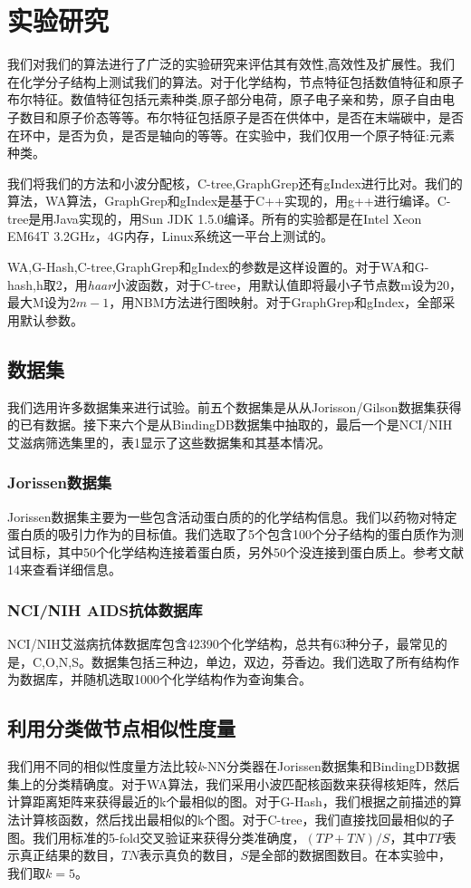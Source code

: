 \documentclass{article}
\begin{document}
\else

\fi
\section{实验研究}
我们对我们的算法进行了广泛的实验研究来评估其有效性,高效性及扩展性。我们在化学分子结构上测试我们的算法。对于化学结构，节点特征包括数值特征和原子布尔特征。数值特征包括元素种类,原子部分电荷，原子电子亲和势，原子自由电子数目和原子价态等等。布尔特征包括原子是否在供体中，是否在末端碳中，是否在环中，是否为负，是否是轴向的等等。在实验中，我们仅用一个原子特征:元素种类。

我们将我们的方法和小波分配核，C-tree,GraphGrep还有gIndex进行比对。我们的算法，WA算法，GraphGrep和gIndex是基于C++实现的，用g++进行编译。C-tree是用Java实现的，用Sun JDK 1.5.0编译。所有的实验都是在Intel Xeon EM64T 3.2GHz，4G内存，Linux系统这一平台上测试的。

WA,G-Hash,C-tree,GraphGrep和gIndex的参数是这样设置的。对于WA和G-hash,h取2，用\emph{haar}小波函数，对于C-tree，用默认值即将最小子节点数m设为20，最大M设为$2m-1$，用NBM方法进行图映射。对于GraphGrep和gIndex，全部采用默认参数。

\subsection{数据集}
我们选用许多数据集来进行试验。前五个数据集是从从Jorisson/Gilson数据集获得的已有数据。接下来六个是从BindingDB数据集中抽取的，最后一个是NCI/NIH 艾滋病筛选集里的，表1显示了这些数据集和其基本情况。
\subsubsection{Jorissen数据集}
Jorissen数据集主要为一些包含活动蛋白质的的化学结构信息。我们以药物对特定蛋白质的吸引力作为的目标值。我们选取了5个包含100个分子结构的蛋白质作为测试目标，其中50个化学结构连接着蛋白质，另外50个没连接到蛋白质上。参考文献14来查看详细信息。

\subsubsection{NCI/NIH AIDS抗体数据库}
NCI/NIH艾滋病抗体数据库包含42390个化学结构，总共有63种分子，最常见的是，C,O,N,S。数据集包括三种边，单边，双边，芬香边。我们选取了所有结构作为数据库，并随机选取1000个化学结构作为查询集合。
\subsection{利用分类做节点相似性度量}
我们用不同的相似性度量方法比较\emph{k}-NN分类器在Jorissen数据集和BindingDB数据集上的分类精确度。对于WA算法，我们采用小波匹配核函数来获得核矩阵，然后计算距离矩阵来获得最近的k个最相似的图。对于G-Hash，我们根据之前描述的算法计算核函数，然后找出最相似的k个图。对于C-tree，我们直接找回最相似的子图。我们用标准的5-fold交叉验证来获得分类准确度，$(TP+TN)/S$，其中$TP$表示真正结果的数目，$TN$表示真负的数目，$S$是全部的数据图数目。在本实验中，我们取$k=5$。
\end{document}
